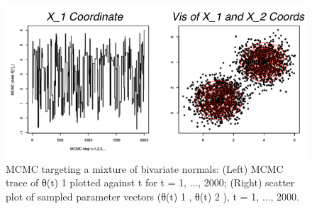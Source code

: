\documentclass{article}
\begin{document}
\begin{figure}
    \centering
    \includegraphics[width=1\linewidth]{ox-hilary/bayes-methods/figures/Screenshot 2024-01-24 at 22.54.48.png}
    \caption{MCMC targeting a mixture of bivariate normals: (Left) MCMC trace of θ(t)  1 plotted  against t for t = 1, ..., 2000; (Right) scatter plot of sampled parameter vectors (θ(t)  1 , θ(t)  2 ), t =  1, ..., 2000. 
}
\end{figure}
\end{document}
